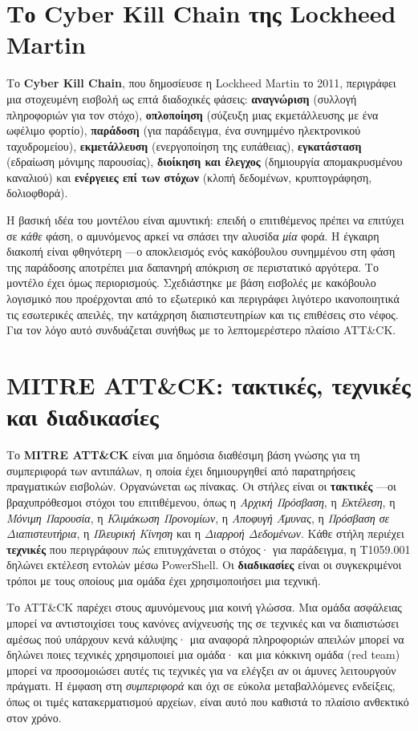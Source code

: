 \documentclass[11pt,openany]{book}
\begin{document}
\section{Το Cyber Kill Chain της Lockheed Martin}\label{sec:3.3}
Το \textbf{Cyber Kill Chain}, που δημοσίευσε η Lockheed Martin το 2011, περιγράφει μια στοχευμένη εισβολή ως επτά διαδοχικές φάσεις: \textbf{αναγνώριση} (συλλογή πληροφοριών για τον στόχο), \textbf{οπλοποίηση} (σύζευξη μιας εκμετάλλευσης με ένα ωφέλιμο φορτίο), \textbf{παράδοση} (για παράδειγμα, ένα συνημμένο ηλεκτρονικού ταχυδρομείου), \textbf{εκμετάλλευση} (ενεργοποίηση της ευπάθειας), \textbf{εγκατάσταση} (εδραίωση μόνιμης παρουσίας), \textbf{διοίκηση και έλεγχος} (δημιουργία απομακρυσμένου καναλιού) και \textbf{ενέργειες επί των στόχων} (κλοπή δεδομένων, κρυπτογράφηση, δολιοφθορά).

Η βασική ιδέα του μοντέλου είναι αμυντική: επειδή ο επιτιθέμενος πρέπει να επιτύχει σε \emph{κάθε} φάση, ο αμυνόμενος αρκεί να σπάσει την αλυσίδα \emph{μία} φορά. Η έγκαιρη διακοπή είναι φθηνότερη —ο αποκλεισμός ενός κακόβουλου συνημμένου στη φάση της παράδοσης αποτρέπει μια δαπανηρή απόκριση σε περιστατικό αργότερα. Το μοντέλο έχει όμως περιορισμούς. Σχεδιάστηκε με βάση εισβολές με κακόβουλο λογισμικό που προέρχονται από το εξωτερικό και περιγράφει λιγότερο ικανοποιητικά τις εσωτερικές απειλές, την κατάχρηση διαπιστευτηρίων και τις επιθέσεις στο νέφος. Για τον λόγο αυτό συνδυάζεται συνήθως με το λεπτομερέστερο πλαίσιο ATT\&CK.

\section{MITRE ATT\&CK: τακτικές, τεχνικές και διαδικασίες}\label{sec:3.4}
Το \textbf{MITRE ATT\&CK} είναι μια δημόσια διαθέσιμη βάση γνώσης για τη συμπεριφορά των αντιπάλων, η οποία έχει δημιουργηθεί από παρατηρήσεις πραγματικών εισβολών. Οργανώνεται ως πίνακας. Οι στήλες είναι οι \textbf{τακτικές} —οι βραχυπρόθεσμοι στόχοι του επιτιθέμενου, όπως η \emph{Αρχική Πρόσβαση}, η \emph{Εκτέλεση}, η \emph{Μόνιμη Παρουσία}, η \emph{Κλιμάκωση Προνομίων}, η \emph{Αποφυγή Άμυνας}, η \emph{Πρόσβαση σε Διαπιστευτήρια}, η \emph{Πλευρική Κίνηση} και η \emph{Διαρροή Δεδομένων}. Κάθε στήλη περιέχει \textbf{τεχνικές} που περιγράφουν \emph{πώς} επιτυγχάνεται ο στόχος· για παράδειγμα, η T1059.001 δηλώνει εκτέλεση εντολών μέσω PowerShell. Οι \textbf{διαδικασίες} είναι οι συγκεκριμένοι τρόποι με τους οποίους μια ομάδα έχει χρησιμοποιήσει μια τεχνική.

Το ATT\&CK παρέχει στους αμυνόμενους μια κοινή γλώσσα. Μια ομάδα ασφάλειας μπορεί να αντιστοιχίσει τους κανόνες ανίχνευσής της σε τεχνικές και να διαπιστώσει αμέσως πού υπάρχουν κενά κάλυψης· μια αναφορά πληροφοριών απειλών μπορεί να δηλώνει ποιες τεχνικές χρησιμοποιεί μια ομάδα· και μια κόκκινη ομάδα (red team) μπορεί να προσομοιώσει αυτές τις τεχνικές για να ελέγξει αν οι άμυνες λειτουργούν πράγματι. Η έμφαση στη \emph{συμπεριφορά} και όχι σε εύκολα μεταβαλλόμενες ενδείξεις, όπως οι τιμές κατακερματισμού αρχείων, είναι αυτό που καθιστά το πλαίσιο ανθεκτικό στον χρόνο.
\end{document}
